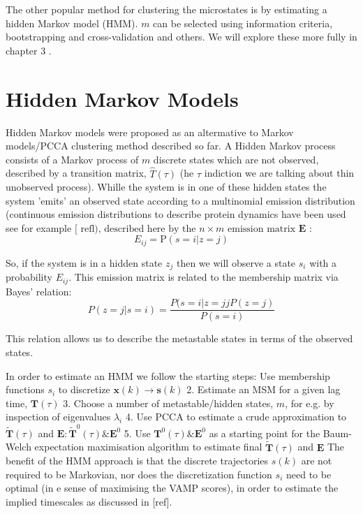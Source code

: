 The other popular method for clustering the microstates is by estimating a hidden Markov model (HMM). $m$ can be selected using information criteria, bootstrapping and cross-validation and others. We will explore these more fully in chapter 3 .

\section{Hidden Markov Models}

Hidden Markov models were proposed as an altermative to Markov models/PCCA clustering method described so far. A Hidden Markov process consists of a Markov process of $m$ discrete states which are not observed, described by a transition matrix, $\widehat{T}(\tau)$ (he $\tau$ indiction we are talking about thin unobserved process). Whille the system is in one of these hidden states the system 'emits' an observed state according to a multinomial emission distribution (continuous emission distributions to describe protein dynamics have been used see for example $[\text { refl), described here by the } n \times m \text { emission matrix } \mathbf{E}$ :
\begin{equation}
E_{i j}=\mathrm{P}(s=i | z=j)
\end{equation}

So, if the system is in a hidden state $z_{j}$ then we will observe a state $s_{i}$ with a probability $E_{i j}$. This emission matrix is related to the membership matrix via Bayes' relation:
\begin{equation}
P(z=j | s=i)=\frac{P(s=i | z=j j P(z=j)}{P(s=i)}
\end{equation}

This relation allows us to describe the metastable states in terms of the observed states.

In order to estimate an HMM we follow the starting steps:
Use membership functions $s_{i}$ to discretize $\mathbf{x}(k) \rightarrow \mathbf{s}(k)$
2. Estimate an MSM for a given lag time, $\mathbf{T}(\tau)$
3. Choose a number of metastable/hidden states, $m$, for e.g. by inspection of eigenvalues $\lambda_{i}$
4. Use PCCA to estimate a crude approximation to $\tilde{\mathbf{T}}(\tau)$ and $\mathbf{E}: \tilde{\mathbf{T}}^{0}(\tau) \& \mathbf{E}^{0}$
5. Use $\mathbf{T}^{0}(\tau) \& \mathbf{E}^{0}$ as a starting point for the Baum-Welch expectation maximisation algorithm to estimate final $\widetilde{\mathbf{T}}(\tau)$ and $\mathbf{E}$
The benefit of the HMM approach is that the discrete trajectories $s(k)$ are not required to be Markovian, nor does the discretization function $s_{i}$ need to be optimal (in
e sense of maximising the VAMP scores), in order to estimate the implied timescales as discussed in [ref].

